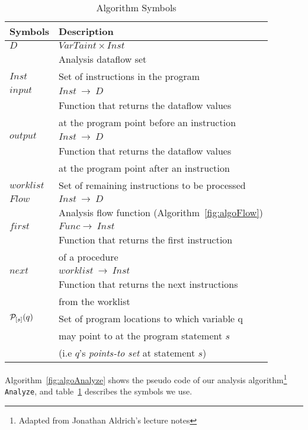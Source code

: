 \begin{table}
\begin{tabular}{|l|l|}
\hline
\textbf{Symbols}	&	\textbf{Description}							\\ \hline
$D$					&	$VarTaint \times Inst$							\\
					&	Analysis dataflow set 							\\ \hline
$Inst$				&	Set of instructions in the program 				\\ \hline
$input$				&	$Inst\ \rightarrow\ D$ 							\\
					&	Function that returns the dataflow values		\\
		    		&	at the program point before an instruction 		\\ 	\hline
$output$			&	$Inst\ \rightarrow\ D$ 							\\
					&	Function that returns the dataflow values		\\
		    		&	at the program point after an instruction 		\\ 	\hline
$worklist$			&	Set of remaining instructions to be processed 	\\ \hline
$Flow$				&	$Inst\ \rightarrow\ D$ 							\\
					&   Analysis flow function (Algorithm~\ref{fig:algoFlow}) 			\\ \hline
$first$				&	$Func \rightarrow\ Inst$ 						\\
					& 	Function that returns the first instruction		\\
					&	of a procedure									\\ \hline
$next$				&	$worklist\ \rightarrow\ Inst$ 					\\
					& 	Function that returns the next instructions		\\
					&	from the worklist								\\ \hline
$\mathcal{P}_{[s]}(q)$	&	Set of program locations to which variable q	\\
					&	may point to at the program statement $s$		\\
					& 	(i.e $q$'s \textit{points-to set} at statement $s$)	\\ \hline					
\end{tabular}
\caption{Algorithm Symbols}\label{symTable}
\end{table}

Algorithm~\ref{fig:algoAnalyze} shows the pseudo code of our
analysis algorithm\footnote{Adapted from Jonathan Aldrich's
lecture notes} \texttt{Analyze}, and table~\ref{symTable}
describes the symbols we use.

